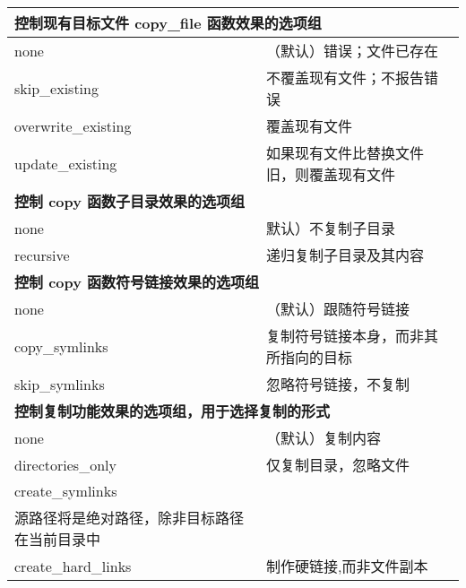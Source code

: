 \begin{longtable}{|ll|}
\hline
\multicolumn{2}{|l|}{\textbf{控制现有目标文件 copy\_file 函数效果的选项组}}             \\ \hline
\endfirsthead
%
\endhead
%
\multicolumn{1}{|l|}{none}                & （默认）错误；文件已存在                                 \\ \hline
\multicolumn{1}{|l|}{skip\_existing}      & 不覆盖现有文件；不报告错误                \\ \hline
\multicolumn{1}{|l|}{overwrite\_existing} & 覆盖现有文件                                          \\ \hline
\multicolumn{1}{|l|}{update\_existing}    & 如果现有文件比替换文件旧，则覆盖现有文件 \\ \hline
\multicolumn{2}{|l|}{\textbf{控制 copy 函数子目录效果的选项组}}                          \\ \hline
\multicolumn{1}{|l|}{none}                & 默认）不复制子目录                                  \\ \hline
\multicolumn{1}{|l|}{recursive}           & 递归复制子目录及其内容                   \\ \hline
\multicolumn{2}{|l|}{\textbf{控制 copy 函数符号链接效果的选项组}}                          \\ \hline
\multicolumn{1}{|l|}{none}                & （默认）跟随符号链接                                       \\ \hline
\multicolumn{1}{|l|}{copy\_symlinks} &
复制符号链接本身，而非其所指向的目标 \\ \hline
\multicolumn{1}{|l|}{skip\_symlinks}      &忽略符号链接，不复制                                                \\ \hline
\multicolumn{2}{|l|}{\textbf{控制复制功能效果的选项组，用于选择复制的形式}}            \\ \hline
\multicolumn{1}{|l|}{none}                & （默认）复制内容                                              \\ \hline
\multicolumn{1}{|l|}{directories\_only}   & 仅复制目录，忽略文件   \\ \hline
\multicolumn{1}{|l|}{create\_symlinks} &
\begin{tabular}[c]{@{}l@{}}创建符号链接而不是文件副本；\\源路径将是绝对路径，除非目标路径在当前目录中\end{tabular}  \\ \hline
\multicolumn{1}{|l|}{create\_hard\_links} & 制作硬链接,而非文件副本                           \\ \hline
\end{longtable}

